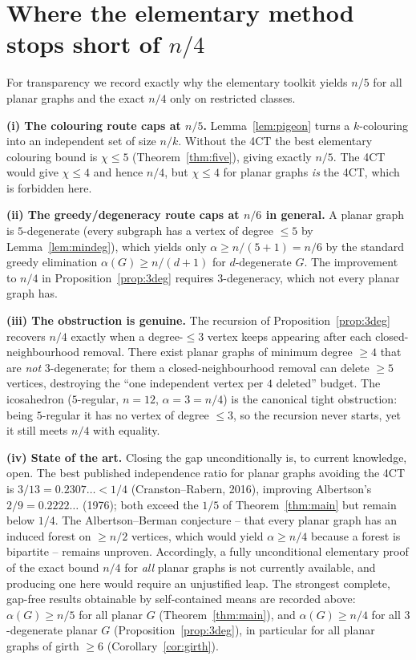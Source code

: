 \documentclass{amsart}
\theoremstyle{remark}
\begin{document}
\section{Where the elementary method stops short of \texorpdfstring{$n/4$}{n/4}}
\label{sec:gap}

For transparency we record exactly why the elementary toolkit yields $n/5$ for
all planar graphs and the exact $n/4$ only on restricted classes.

\medskip
\noindent\textbf{(i) The colouring route caps at $n/5$.}
Lemma~\ref{lem:pigeon} turns a $k$-colouring into an independent set of size
$n/k$. Without the 4CT the best elementary colouring bound is $\chi\le5$
(Theorem~\ref{thm:five}), giving exactly $n/5$. The 4CT would give $\chi\le4$ and
hence $n/4$, but $\chi\le4$ for planar graphs \emph{is} the 4CT, which is
forbidden here.

\medskip
\noindent\textbf{(ii) The greedy/degeneracy route caps at $n/6$ in general.}
A planar graph is $5$-degenerate (every subgraph has a vertex of degree $\le5$ by
Lemma~\ref{lem:mindeg}), which yields only $\alpha\ge n/(5+1)=n/6$ by the standard
greedy elimination $\alpha(G)\ge n/(d+1)$ for $d$-degenerate $G$. The improvement
to $n/4$ in Proposition~\ref{prop:3deg} requires $3$-degeneracy, which not every
planar graph has.

\medskip
\noindent\textbf{(iii) The obstruction is genuine.}
The recursion of Proposition~\ref{prop:3deg} recovers $n/4$ exactly when a
degree-$\le3$ vertex keeps appearing after each closed-neighbourhood removal.
There exist planar graphs of minimum degree $\ge4$ that are \emph{not}
$3$-degenerate; for them a closed-neighbourhood removal can delete $\ge5$
vertices, destroying the ``one independent vertex per $4$ deleted'' budget. The
icosahedron ($5$-regular, $n=12$, $\alpha=3=n/4$) is the canonical tight
obstruction: being $5$-regular it has no vertex of degree $\le3$, so the
recursion never starts, yet it still meets $n/4$ with equality.

\medskip
\noindent\textbf{(iv) State of the art.}
Closing the gap unconditionally is, to current knowledge, open. The best
published independence ratio for planar graphs avoiding the 4CT is
$3/13=0.2307\ldots<1/4$ (Cranston--Rabern, 2016), improving Albertson's
$2/9=0.2222\ldots$ (1976); both exceed the $1/5$ of Theorem~\ref{thm:main} but
remain below $1/4$. The Albertson--Berman conjecture -- that every planar graph
has an induced forest on $\ge n/2$ vertices, which would yield $\alpha\ge n/4$
because a forest is bipartite -- remains unproven. Accordingly, a fully
unconditional elementary proof of the exact bound $n/4$ for \emph{all} planar
graphs is not currently available, and producing one here would require an
unjustified leap. The strongest complete, gap-free results obtainable by
self-contained means are recorded above: $\alpha(G)\ge n/5$ for all planar $G$
(Theorem~\ref{thm:main}), and $\alpha(G)\ge n/4$ for all $3$-degenerate planar
$G$ (Proposition~\ref{prop:3deg}), in particular for all planar graphs of girth
$\ge6$ (Corollary~\ref{cor:girth}).
\end{document}
